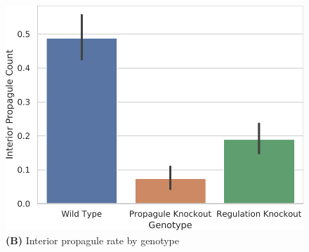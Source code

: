 \begin{figure}[!htbp]
\begin{center}
\begin{minipage}[t]{0.5\linewidth}
\begin{minipage}[t]{\linewidth}
\centering
\vspace{0pt} %
\begin{minipage}[b]{\linewidth}
\includegraphics[width=\linewidth]{img/knockout/interior_propagule/title=interior_propagules+_data_hathash_hash=bb0fa6254f1b7398+_script_fullcat_hash=f738b363bea8c98a+_source_hash=53a2252-clean+ext=}
{\textbf{(B)} Interior propagule rate by genotype}
\end{minipage}
\end{minipage}%
\hspace*{\fill}

\end{minipage}


\end{center}
\end{figure}
